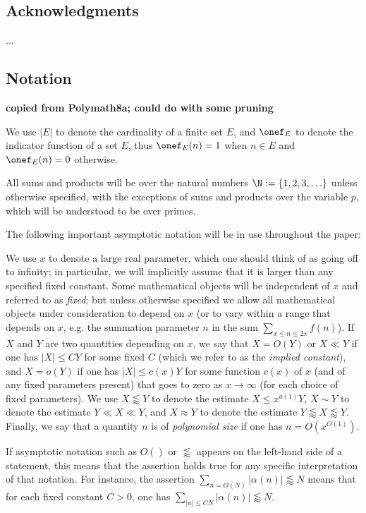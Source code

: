 \subsection{Acknowledgments}

...

\subsection{Notation}

{\bf copied from Polymath8a; could do with some pruning}

We use $|E|$ to denote the cardinality of a finite set $E$, and $\onef_E$ to denote the indicator function of a set $E$, thus $\onef_E(n)=1$ when $n \in E$ and $\onef_E(n)=0$ otherwise.  

All sums and products will be over the natural numbers $\N := \{1,2,3,\ldots\}$ unless otherwise specified, with the exceptions of sums and products over the variable $p$, which will be understood to be over primes.

The following important asymptotic notation will be in use throughout the paper:

\begin{definition}\label{asym}  We use $x$ to denote a large real parameter, which one should think of as going off to infinity; in particular, we will implicitly assume that it is larger than any specified fixed constant. Some mathematical objects will be independent of $x$ and referred to as \emph{fixed}; but unless otherwise specified we allow all mathematical objects under consideration to depend on $x$ (or to vary within a range that depends on $x$, e.g. the summation parameter $n$ in the sum $\sum_{x \leq n \leq 2x} f(n)$).  If $X$ and $Y$ are two quantities depending on $x$, we say that $X = O(Y)$ or $X \ll Y$ if one has $|X| \leq CY$ for some fixed $C$ (which we refer to as the \emph{implied constant}), and $X = o(Y)$ if one has $|X| \leq c(x) Y$ for some function $c(x)$ of $x$ (and of any fixed parameters present) that goes to zero as $x \to \infty$ (for each choice of fixed parameters).  We use $X \lessapprox Y$ to denote the estimate $X \leq x^{o(1)} Y$, $X \sim Y$ to denote the estimate $Y \ll X \ll Y$, and $X \approx Y$ to denote the estimate $Y \lessapprox X \lessapprox Y$.  Finally, we say that a quantity $n$ is of \emph{polynomial size} if one has $n = O(x^{O(1)})$.

If asymptotic notation such as $O()$ or $\lessapprox$ appears on the left-hand side of a statement, this means that the assertion holds true for any specific interpretation of that notation.  For instance, the assertion $\sum_{n=O(N)} |\alpha(n)| \lessapprox N$ means that for each fixed constant $C>0$, one has $\sum_{|n| \leq CN} |\alpha(n)|\lessapprox N$.
\end{definition}

